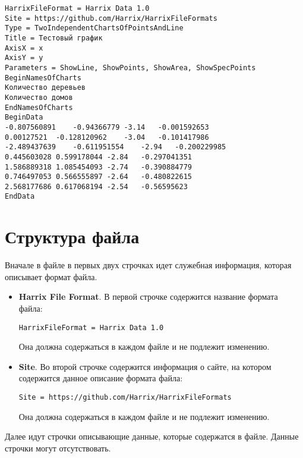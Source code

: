 \documentclass[a4paper,12pt]{article}
\begin{document}
\begin{lstlisting}[label=Example01,caption=Пример файла *.hdata]
HarrixFileFormat = Harrix Data 1.0
Site = https://github.com/Harrix/HarrixFileFormats
Type = TwoIndependentChartsOfPointsAndLine
Title = Тестовый график
AxisX = x
AxisY = y
Parameters = ShowLine, ShowPoints, ShowArea, ShowSpecPoints
BeginNamesOfCharts
Количество деревьев
Количество домов
EndNamesOfCharts
BeginData
-0.807560891	-0.94366779	-3.14	-0.001592653
0.00127521	-0.128120962	-3.04	-0.101417986
-2.489437639	-0.611951554	-2.94	-0.200229985
0.445603028	0.599178044	-2.84	-0.297041351
1.586889318	1.085454093	-2.74	-0.390884779
0.746497053	0.566555897	-2.64	-0.480822615
2.568177686	0.617068194	-2.54	-0.56595623
EndData
\end{lstlisting}

\section{Структура файла}

Вначале в файле в первых двух строчках идет служебная информация, которая описывает формат файла.

\begin{itemize}
\item \textbf{Harrix File Format}.
В первой строчке содержится название формата файла:
\begin{lstlisting}[label=Line01,caption=Первая строчка файла *.hdata]
HarrixFileFormat = Harrix Data 1.0
\end{lstlisting}
Она должна содержаться в каждом файле и не подлежит изменению.

\item \textbf{Site}.
Во второй строчке содержится информация о сайте, на котором содержится данное описание формата файла:
\begin{lstlisting}[label=Line02,caption=Вторая строчка файла *.hdata]
Site = https://github.com/Harrix/HarrixFileFormats
\end{lstlisting}
Она должна содержаться в каждом файле и не подлежит изменению.
\end{itemize}

Далее идут строчки описывающие данные, которые содержатся в файле. Данные строчки могут отсутствовать.
\end{document}
